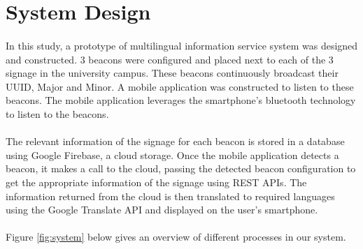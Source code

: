 \documentclass[12pt]{article}
\begin{document}
%
%


\section{System Design}
\label{system}
\paragraph{}In this study, a prototype of multilingual information service system was designed and constructed. 3 beacons were configured and placed next to each of the 3 signage in the university campus. These beacons continuously broadcast their UUID, Major and Minor. A mobile application was constructed to listen to these beacons. The mobile application leverages the smartphone’s bluetooth technology to listen to the beacons.

\paragraph{}The relevant information of the signage for each beacon is stored in a database using Google Firebase, a cloud storage. Once the mobile application detects a beacon, it makes a call to the cloud, passing the detected beacon configuration to get the appropriate information of the signage using REST APIs. The information returned from the cloud is then translated to required languages using the Google Translate API and displayed on the user’s smartphone.

\paragraph{}Figure \ref{fig:system} below gives an overview of different processes in our system.
\end{document}
